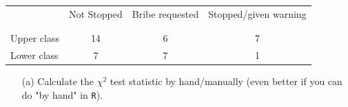 \documentclass[12pt,letterpaper]{article}
\begin{document}
\newpage
\begin{table}[h!]
	\centering
	\begin{tabular}{l | c c c }
		& Not Stopped & Bribe requested & Stopped/given warning \\
		\\[-1.8ex] 
		\hline \\[-1.8ex]
		Upper class & 14 & 6 & 7 \\
		Lower class & 7 & 7 & 1 \\
		\hline
	\end{tabular}
\end{table}

\begin{enumerate}
	
	\item [(a)]
	Calculate the $\chi^2$ test statistic by hand/manually (even better if you can do "by hand" in \texttt{R}).\\
	

\end{enumerate}
\end{document}
